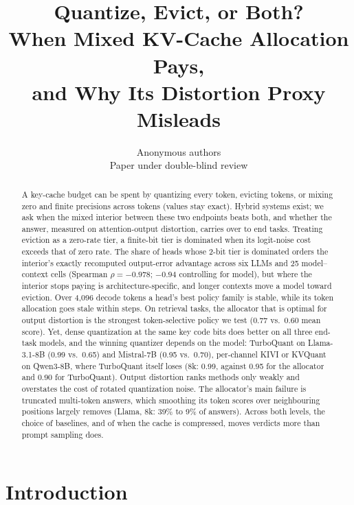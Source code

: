 \documentclass{article}
\title{Quantize, Evict, or Both?\\
When Mixed KV-Cache Allocation Pays,\\
and Why Its Distortion Proxy Misleads}
\author{Anonymous authors \\ Paper under double-blind review}
\theoremstyle{definition}
\begin{document}
\maketitle

\begin{abstract}
A key-cache budget can be spent by quantizing every token, evicting tokens, or mixing zero and finite precisions across tokens (values stay exact).  Hybrid systems exist; we ask when the mixed interior between these two endpoints beats both, and whether the answer, measured on attention-output distortion, carries over to end tasks.  Treating eviction as a zero-rate tier, a finite-bit tier is dominated when its logit-noise cost exceeds that of zero rate.  The share of heads whose 2-bit tier is dominated orders the interior's exactly recomputed output-error advantage across six LLMs and 25 model--context cells (Spearman $\rho=-0.978$; $-0.94$ controlling for model), but where the interior stops paying is architecture-specific, and longer contexts move a model toward eviction.  Over 4,096 decode tokens a head's best policy family is stable, while its token allocation goes stale within steps.  On retrieval tasks, the allocator that is optimal for output distortion is the strongest token-selective policy we test (0.77 vs.\ 0.60 mean score).  
Yet, %
dense quantization at the same key code bits does better on all three end-task models, and the winning quantizer depends on the model: TurboQuant on Llama-3.1-8B (0.99 vs.\ 0.65) and Mistral-7B (0.95 vs.\ 0.70), per-channel KIVI or KVQuant on Qwen3-8B, where TurboQuant itself loses (8k: 0.99, against 0.95 for the allocator and 0.90 for TurboQuant).  Output distortion ranks methods only weakly and overstates the cost of rotated quantization noise.  The allocator's main failure is truncated multi-token answers, which smoothing its token scores over neighbouring positions largely removes (Llama, 8k: 39\% to 9\% of answers).  Across both levels, the choice of baselines, and of when the cache is compressed, moves verdicts more than prompt sampling does.
\end{abstract}

\section{Introduction}
\label{sec:intro}
\end{document}
